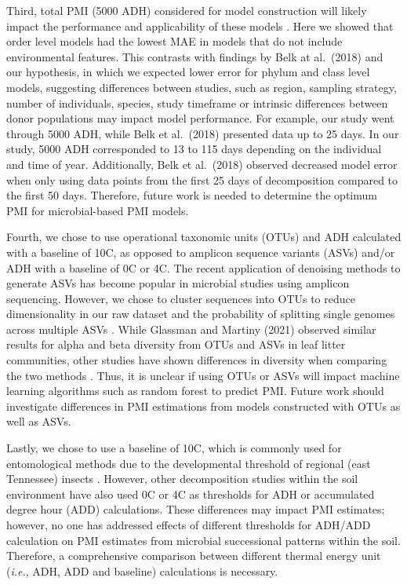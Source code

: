 \documentclass[
  10pt,
  letterpaper,
]{article}
\begin{document}
Third, total PMI (5000 ADH) considered for model construction will
likely impact the performance and applicability of these models
\citep{metcalf_estimating_2019}. Here we showed that order level models
had the lowest MAE in models that do not include environmental features.
This contrasts with findings by Belk at al.~(2018)
\citep{belk_microbiome_2018} and our hypothesis, in which we expected
lower error for phylum and class level models, suggesting differences
between studies, such as region, sampling strategy, number of
individuals, species, study timeframe or intrinsic differences between
donor populations may impact model performance. For example, our study
went through 5000 ADH, while Belk et al.~(2018)
\citep{belk_microbiome_2018} presented data up to 25 days. In our study,
5000 ADH corresponded to 13 to 115 days depending on the individual and
time of year. Additionally, Belk et al.~(2018)
\citep{belk_microbiome_2018} observed decreased model error when only
using data points from the first 25 days of decomposition compared to
the first 50 days. Therefore, future work is needed to determine the
optimum PMI for microbial-based PMI models.

Fourth, we chose to use operational taxonomic units (OTUs) and ADH
calculated with a baseline of 10\textdegree C, as opposed to amplicon
sequence variants (ASVs) and/or ADH with a baseline of 0\textdegree C or
4\textdegree C. The recent application of denoising methods to generate
ASVs has become popular in microbial studies using amplicon sequencing.
However, we chose to cluster sequences into OTUs to reduce
dimensionality in our raw dataset and the probability of splitting
single genomes across multiple ASVs
\citep{patrick_d_schloss_amplicon_2021}. While Glassman and Martiny
(2021) \citep{glassman_broadscale_2018} observed similar results for
alpha and beta diversity from OTUs and ASVs in leaf litter communities,
other studies have shown differences in diversity when comparing the two
methods \citep{chiarello_ranking_2022}. Thus, it is unclear if using
OTUs or ASVs will impact machine learning algorithms such as random
forest to predict PMI. Future work should investigate differences in PMI
estimations from models constructed with OTUs as well as ASVs.

Lastly, we chose to use a baseline of 10\textdegree C, which is commonly
used for entomological methods due to the developmental threshold of
regional (east Tennessee) insects \citep{byrd_development_2001}.
However, other decomposition studies within the soil environment have
also used 0\textdegree C or 4\textdegree C as thresholds for ADH or
accumulated degree hour (ADD) calculations. These differences may impact
PMI estimates; however, no one has addressed effects of different
thresholds for ADH/ADD calculation on PMI estimates from microbial
successional patterns within the soil. Therefore, a comprehensive
comparison between different thermal energy unit (\emph{i.e.}, ADH, ADD
and baseline) calculations is necessary.
\end{document}
